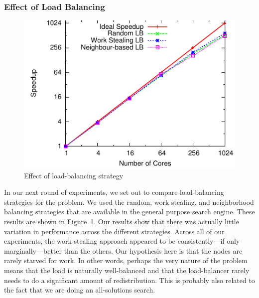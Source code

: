 \documentclass[times, 10pt,twocolumn]{article}
\begin{document}
\subsubsection{Effect of Load Balancing}
\begin{figure}[h]
\centering
\includegraphics[width=0.9\columnwidth]{plots/3schemes.pdf}
\vspace{-0.1in}
\caption{Effect of load-balancing strategy}
\label{3schemes}
\vspace{-0.2in}
\end{figure}

In our next round of experiments, we set out to compare load-balancing
strategies for the problem.  We used the random, work stealing, and
neighborhood balancing strategies that are available in the general purpose
search engine.  These results are shown in Figure~\ref{3schemes}.  Our results
show that there was actually little variation in performance across the
different strategies.  Across all of our experiments, the work stealing
approach appeared to be consistently---if only marginally---better than the
others.  Our hypothesis here is that the nodes are rarely starved for work.  In
other words, perhaps the very nature of the problem means that the load is
naturally well-balanced and that the load-balancer rarely needs to do a
significant amount of redistribution.  This is probably also related to the
fact that we are doing an all-solutions search. 

 
\end{document}

